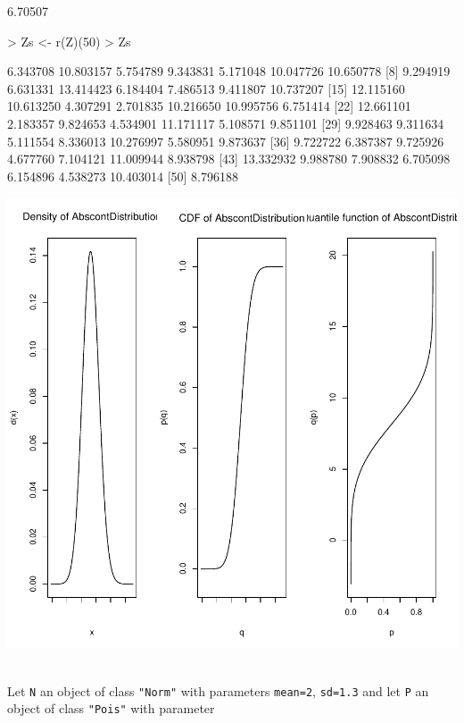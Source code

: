 \documentclass[11pt]{article}
\newcommand{\code}[1]{{\tt #1}}
\begin{document}
\begin{Schunk}
\begin{Soutput}
[1] 6.70507
\end{Soutput}
\begin{Sinput}
> Zs <- r(Z)(50)
> Zs
\end{Sinput}
\begin{Soutput}
 [1]  6.343708 10.803157  5.754789  9.343831  5.171048 10.047726 10.650778
 [8]  9.294919  6.631331 13.414423  6.184404  7.486513  9.411807 10.737207
[15] 12.115160 10.613250  4.307291  2.701835 10.216650 10.995756  6.751414
[22] 12.661101  2.183357  9.824653  4.534901 11.171117  5.108571  9.851101
[29]  9.928463  9.311634  5.111554  8.336013 10.276997  5.580951  9.873637
[36]  9.722722  6.387387  9.725926  4.677760  7.104121 11.009944  8.938798
[43] 13.332932  9.988780  7.908832  6.705098  6.154896  4.538273 10.403014
[50]  8.796188
\end{Soutput}
\end{Schunk}
\includegraphics{distr-exam1}
\par
\begin{small}
\\
Let \code{N} an object of class \code{"Norm"} with parameters  \code{mean=2},
\code{sd=1.3} and let \code{P}  an object of class \code{"Pois"} with parameter

\end{small}
\end{document}
\end{Sinput}
\end{Schunk}
\end{document}
